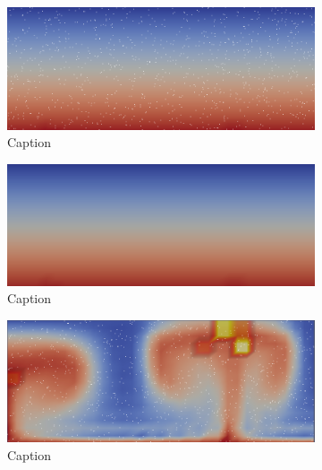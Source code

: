 \begin{figure}
    \centering
    \begin{subfigure}{0.49\textwidth}
        \centering
        \includegraphics[width=\textwidth]{figures/box_batch0.png}
        \caption{Caption}
        \label{fig:my_label}
    \end{subfigure}
    \hfill
    \begin{subfigure}{0.49\textwidth}
        \centering
        \includegraphics[width=\textwidth]{figures/box_2pp0.png}
        \caption{Caption}
        \label{fig:my_label}
    \end{subfigure}
    \begin{subfigure}{0.49\textwidth}
        \centering
        \includegraphics[width=\textwidth]{figures/box_batch38.png}
        \caption{Caption}
        \label{fig:my_label}
    \end{subfigure}
    \hfill
    \begin{subfigure}{0.49\textwidth}

\end{subfigure}
\end{figure}
